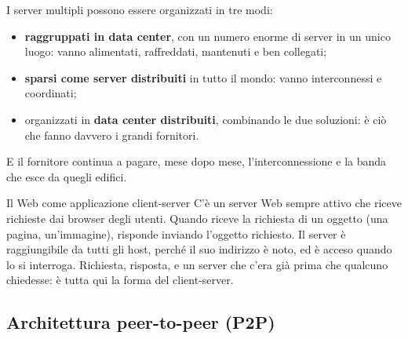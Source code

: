 I server multipli possono essere organizzati in tre modi:

\begin{itemize}
    \item \textbf{raggruppati in data center}, con un numero enorme di server in un unico luogo: vanno
          alimentati, raffreddati, mantenuti e ben collegati;
    \item \textbf{sparsi come server distribuiti} in tutto il mondo: vanno interconnessi e coordinati;
    \item organizzati in \textbf{data center distribuiti}, combinando le due soluzioni: è ciò che fanno davvero
          i grandi fornitori.
\end{itemize}

E il fornitore continua a pagare, mese dopo mese, l'interconnessione e la banda che esce da quegli edifici.


\begin{esempio}{Il Web come applicazione client-server}
C'è un server Web sempre attivo che riceve richieste dai browser degli utenti. Quando riceve la
richiesta di un oggetto (una pagina, un'immagine), risponde inviando l'oggetto richiesto. Il server
è raggiungibile da tutti gli host, perché il suo indirizzo è noto, ed è acceso quando lo si interroga.
Richiesta, risposta, e un server che c'era già prima che qualcuno chiedesse: è tutta qui la forma del
client-server.
\end{esempio}

\subsection{Architettura peer-to-peer (P2P)}


